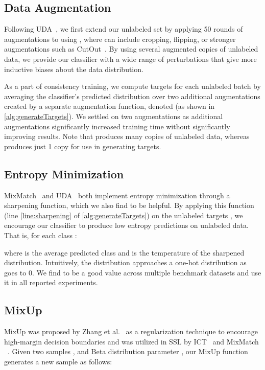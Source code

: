 \documentclass[10pt,twocolumn,letterpaper]{article}
\begin{document}
\subsection{Data Augmentation}
\label{dataaugmentation}

Following UDA~\cite{udaXie}, we first extend our unlabeled set  by applying 50 rounds of augmentations to  using , where  can include cropping, flipping, or stronger augmentations such as CutOut~\cite{cutoutDevries}. By using several augmented copies of unlabeled data, we provide our classifier with a wide range of perturbations that give more inductive biases about the data distribution.

As a part of consistency training, we compute targets  for each unlabeled batch  by averaging the classifier's predicted distribution over two additional augmentations created by a separate augmentation function, denoted  (as shown in \cref{alg:generateTargets}). We settled on two augmentations as additional augmentations significantly increased training time without significantly improving results. Note that  produces many copies of unlabeled data, whereas  produces just 1 copy for use in generating targets.

\subsection{Entropy Minimization}
\label{entropyminimization}

MixMatch~\cite{mixmatchBerthelot} and UDA~\cite{udaXie} both implement entropy minimization through a sharpening function, which we also find to be helpful. By applying this function (line \ref{line:sharpening} of \cref{alg:generateTargets}) on the unlabeled targets , we encourage our classifier to produce low entropy predictions on unlabeled data. That is, for each class :


where  is the average predicted class and  is the temperature of the sharpened distribution. Intuitively, the distribution approaches a one-hot distribution as  goes to 0. We find  to be a good value across multiple benchmark datasets and use it in all reported experiments.  

\subsection{MixUp}
\label{mixup}
MixUp was proposed by Zhang et al.~\cite{mixupZhang} as a regularization technique to encourage high-margin decision boundaries and was utilized in SSL by ICT~\cite{ictVerma} and MixMatch ~\cite{mixmatchBerthelot}. Given two samples ,  and Beta distribution parameter , our MixUp function generates a new sample  as follows:
\end{document}
